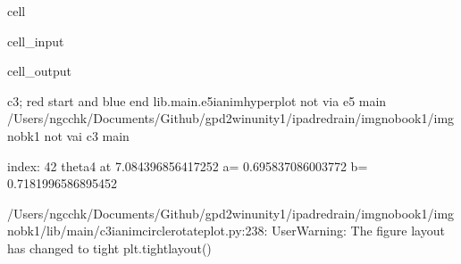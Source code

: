 \documentclass[letterpaper,10pt,english]{jupyterBook}
\begin{document}
\begin{sphinxuseclass}{cell}\begin{sphinxVerbatimInput}

\begin{sphinxuseclass}{cell_input}
\begin{sphinxVerbatim}[commandchars=\\\{\}]
 
 
   
\end{sphinxVerbatim}

\end{sphinxuseclass}\end{sphinxVerbatimInput}
\begin{sphinxVerbatimOutput}

\begin{sphinxuseclass}{cell_output}
\begin{sphinxVerbatim}[commandchars=\\\{\}]
c3; red start and blue end
lib.main.e5\PYGZus{}i\PYGZus{}anim\PYGZus{}hyperplot
not via e5 main
/Users/ngcchk/Documents/Github/gpd2\PYGZhy{}win\PYGZhy{}unity1/ipadred\PYGZhy{}rain/imgno\PYGZus{}book1/imgnobk1
not vai c3 main

index: 42 
theta4 at  7.084396856417252 
 a= 0.695837086003772  b= 0.7181996586895452 
\end{sphinxVerbatim}

\begin{sphinxVerbatim}[commandchars=\\\{\}]
/Users/ngcchk/Documents/Github/gpd2\PYGZhy{}win\PYGZhy{}unity1/ipadred\PYGZhy{}rain/imgno\PYGZus{}book1/imgnobk1/lib/main/c3\PYGZus{}i\PYGZus{}anim\PYGZus{}circle\PYGZus{}rotate\PYGZus{}plot.py:238: UserWarning: The figure layout has changed to tight
  plt.tight\PYGZus{}layout()
\end{sphinxVerbatim}

\noindent{}

\end{sphinxuseclass}\end{sphinxVerbatimOutput}

\end{sphinxuseclass}
\end{document}
